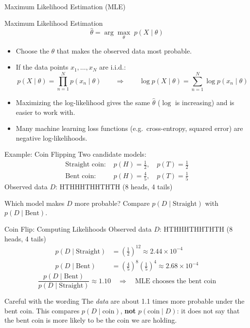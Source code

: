 \documentclass[aspectratio=169]{beamer}
\begin{document}
\begin{frame}{Maximum Likelihood Estimation (MLE)}
\begin{block}{Maximum Likelihood Estimation}
\[
  \hat{\theta} = \arg\max_{\theta}\; p(X\mid\theta)
\]
\end{block}
\begin{itemize}
  \item Choose the $\theta$ that makes the observed data most probable.
  \item If the data points $x_1,\dots,x_N$ are i.i.d.:
  \[
    p(X\mid\theta) = \prod_{n=1}^{N} p(x_n\mid\theta)
    \qquad\Rightarrow\qquad
    \log p(X\mid\theta) = \sum_{n=1}^{N} \log p(x_n\mid\theta)
  \]
  \item Maximizing the log-likelihood gives the same $\hat\theta$ ($\log$ is increasing) and is easier to work with.
  \item Many machine learning loss functions (e.g.\ cross-entropy, squared error) are negative log-likelihoods.
\end{itemize}
\end{frame}

\begin{frame}{Example: Coin Flipping}
Two candidate models:
\begin{align*}
  \text{Straight coin: } & p(H)=\tfrac{1}{2},\quad p(T)=\tfrac{1}{2} \\
  \text{Bent coin: }     & p(H)=\tfrac{4}{5},\quad p(T)=\tfrac{1}{5}
\end{align*}
Observed data $D$: HTHHHTHHTHTH \quad (8 heads, 4 tails)

\vspace{0.4cm}
Which model makes $D$ more probable? \;Compare $p(D\mid\text{Straight})$ with $p(D\mid\text{Bent})$.
\end{frame}

\begin{frame}{Coin Flip: Computing Likelihoods}
Observed data $D$: HTHHHTHHTHTH (8 heads, 4 tails)
\begin{align*}
  p(D\mid\text{Straight}) &= \left(\tfrac{1}{2}\right)^{12} \approx 2.44\times 10^{-4} \\
  p(D\mid\text{Bent})     &= \left(\tfrac{4}{5}\right)^{8}\left(\tfrac{1}{5}\right)^{4} \approx 2.68\times 10^{-4}
\end{align*}
\[
  \frac{p(D\mid\text{Bent})}{p(D\mid\text{Straight})} \approx 1.10
  \quad\Rightarrow\quad \text{MLE chooses the bent coin}
\]
\begin{alertblock}{Careful with the wording}
The \emph{data} are about 1.1 times more probable under the bent coin.
This compares $p(D\mid\text{coin})$, \textbf{not} $p(\text{coin}\mid D)$:
it does not say that the bent coin is more likely to be the coin we are holding.
\end{alertblock}
\end{frame}
\end{document}
